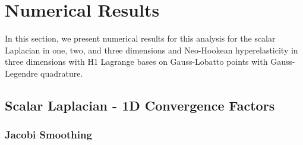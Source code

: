 \documentclass[review]{siamart190516}
\begin{document}
\section{Numerical Results}\label{sec:results}

In this section, we present numerical results for this analysis for the scalar Laplacian in one, two, and three dimensions and Neo-Hookean hyperelasticity in three dimensions with H1 Lagrange bases on Gauss-Lobatto points with Gauss-Legendre quadrature.

\subsection{Scalar Laplacian - 1D Convergence Factors}\label{sec:1dresults}

\subsubsection{Jacobi Smoothing}
\end{document}
